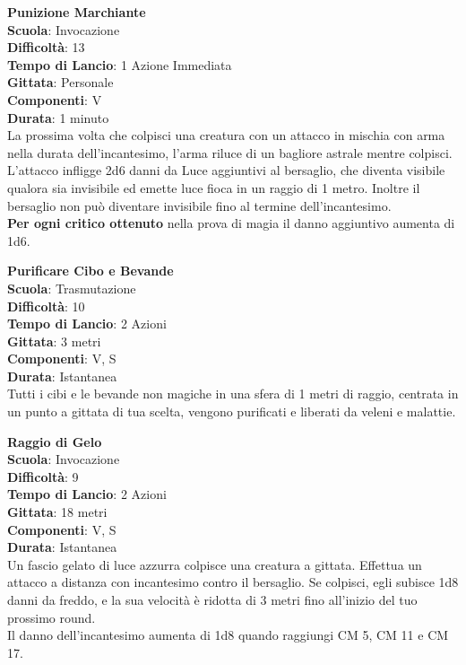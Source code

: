 \begin{multicols}{2}
\medskip\textbf{Punizione Marchiante}\\
\textbf{Scuola}: Invocazione\\
\textbf{Difficoltà}:  13\\
\textbf{Tempo di Lancio}: 1 Azione Immediata\\
\textbf{Gittata}: Personale\\
\textbf{Componenti}: V\\
\textbf{Durata}: 1 minuto\\
La prossima volta che colpisci una creatura con un attacco in mischia con arma nella durata dell'incantesimo, l’arma riluce di un bagliore astrale mentre colpisci. L’attacco infligge 2d6 danni da Luce aggiuntivi al bersaglio, che diventa visibile qualora sia invisibile ed emette luce fioca in un raggio di 1 metro. Inoltre il bersaglio non può diventare invisibile fino al termine dell'incantesimo. \\
\textbf{Per ogni critico ottenuto} nella prova di magia il danno aggiuntivo aumenta di 1d6.

\medskip\textbf{Purificare Cibo e Bevande}\\
\textbf{Scuola}: Trasmutazione\\
\textbf{Difficoltà}:  10\\
\textbf{Tempo di Lancio}: 2 Azioni\\
\textbf{Gittata}: 3 metri\\
\textbf{Componenti}: V, S\\
\textbf{Durata}: Istantanea\\
Tutti i cibi e le bevande non magiche in una sfera di 1 metri di raggio, centrata in un punto a gittata di tua scelta, vengono purificati e liberati da veleni e malattie. 

\medskip\textbf{Raggio di Gelo}\\
\textbf{Scuola}: Invocazione\\
\textbf{Difficoltà}:  9\\
\textbf{Tempo di Lancio}: 2 Azioni\\
\textbf{Gittata}: 18 metri\\
\textbf{Componenti}: V, S\\
\textbf{Durata}: Istantanea\\
Un fascio gelato di luce azzurra colpisce una creatura a gittata. Effettua un attacco a distanza con incantesimo contro il bersaglio. Se colpisci, egli subisce 1d8 danni da freddo, e la sua velocità è ridotta di 3 metri fino all'inizio del tuo prossimo round. \\
Il danno dell'incantesimo aumenta di 1d8 quando raggiungi CM 5, CM 11 e CM 17.


\end{multicols}
